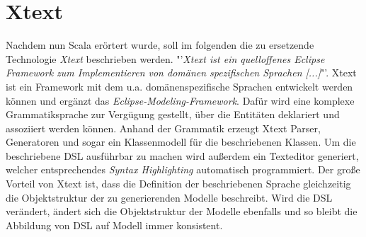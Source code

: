 \section{Xtext}\label{xtext}
Nachdem nun Scala erörtert wurde, soll im folgenden die zu ersetzende Technologie \textit{Xtext} beschrieben werden.
"'\textit{Xtext ist ein quelloffenes \textit{Eclipse Framework} zum Implementieren von domänen spezifischen Sprachen [...]}"'.
Xtext ist ein Framework mit dem u.a. domänenspezifische Sprachen entwickelt werden können und ergänzt das \textit{Eclipse-Modeling-Framework}. Dafür wird eine komplexe Grammatiksprache zur Vergügung gestellt, über die Entitäten deklariert und assoziiert werden können. Anhand der Grammatik erzeugt Xtext Parser, Generatoren und sogar ein Klassenmodell für die beschriebenen Klassen. Um die beschriebene DSL ausführbar zu machen wird außerdem ein Texteditor generiert, welcher entsprechendes \textit{Syntax Highlighting} automatisch programmiert. Der große Vorteil von Xtext ist, dass die Definition der beschriebenen Sprache gleichzeitig die Objektstruktur der zu generierenden Modelle beschreibt. Wird die DSL verändert, ändert sich die Objektstruktur der Modelle ebenfalls und so bleibt die Abbildung von DSL auf Modell immer konsistent. 
